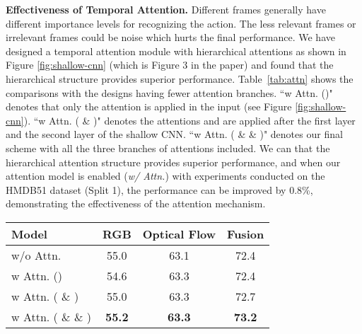 \documentclass[english, 10pt, twocolumn, twoside]{IEEEtran}
\begin{document}
\noindent\textbf{Effectiveness of Temporal Attention.} Different frames generally have different importance levels for recognizing the action. The less relevant frames or irrelevant frames could be noise which hurts the final performance. We have designed a temporal attention module with hierarchical attentions as shown in Figure \ref{fig:shallow-cnn} (which is Figure 3 in the paper) and found that the hierarchical structure provides superior performance. Table~\ref{tab:attn} shows the comparisons with the designs having fewer attention branches. ``w Attn. ()" denotes that only the attention  is applied in the input (see Figure \ref{fig:shallow-cnn}).  ``w Attn. ( \& )" denotes the attentions  and  are applied after the first layer and the second layer of the shallow CNN. ``w Attn. ( \&  \& )" denotes our final scheme with all the three branches of attentions included. We can that the hierarchical attention structure provides superior performance, and when our attention model is enabled (\emph{w/ Attn.}) with experiments conducted on the HMDB51 dataset (Split 1), the performance can be improved by 0.8\%, demonstrating the effectiveness of the attention mechanism. 

\begin{table*}[t]
	\caption{Accuracy (\%) of two-stream based network TSN+TSM without (w/o Attn.) and with (w/o Attn.) temporal attention on the HMDB51 dataset (Split 1).}
	\label{tab:attn}
	\fontsize{9pt}{10pt}\selectfont\centering
	\tabcolsep=14pt
	\begin{center}
		\begin{tabular}{|l|c|c|c|}
			\hline
			Model & RGB & Optical Flow & Fusion \\
			\hline\hline
			w/o Attn. & 55.0 & 63.1 & 72.4 \\
w Attn. () & 54.6 & 63.3 & 72.4\\
			w Attn. ( \& ) & 55.0 & 63.3 & 72.7 \\
			w Attn. ( \&  \& )& \textbf{55.2} & \textbf{63.3} & \textbf{73.2} \\
			\hline
		\end{tabular}
	\end{center}
\end{table*}
\end{document}
